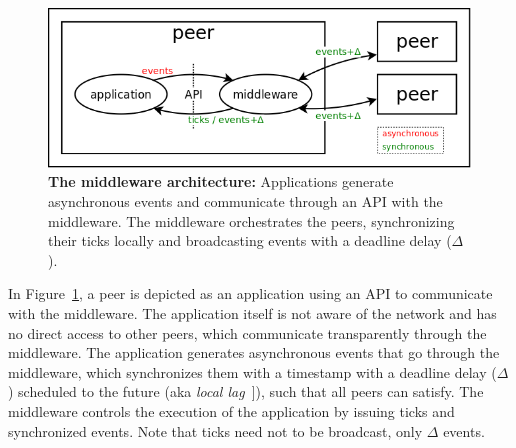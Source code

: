 \documentclass[10pt,journal,compsoc]{IEEEtran}
\begin{document}
\begin{figure}
  \centering
  \includegraphics[width=\linewidth]{middleware}
  \caption{
    \textbf{The middleware architecture:}
    Applications generate asynchronous events and communicate through an API
    with the middleware.
    The middleware orchestrates the peers, synchronizing their ticks locally
    and broadcasting events with a deadline delay ($\Delta$).
    \label{fig.middleware}
  }
\end{figure}

In Figure~\ref{fig.middleware}, a peer is depicted as an application using an
API to communicate with the middleware.
The application itself is not aware of the network and has no direct access to
other peers, which communicate transparently through the middleware.
The application generates asynchronous events that go through the middleware,
which synchronizes them with a timestamp with a deadline delay ($\Delta$)
scheduled to the future (aka \emph{local lag}~\cite{mauve}]), such that all
peers can satisfy.
The middleware controls the execution of the application by issuing ticks and
synchronized events.
Note that ticks need not to be broadcast, only $\Delta$ events.
\end{document}
